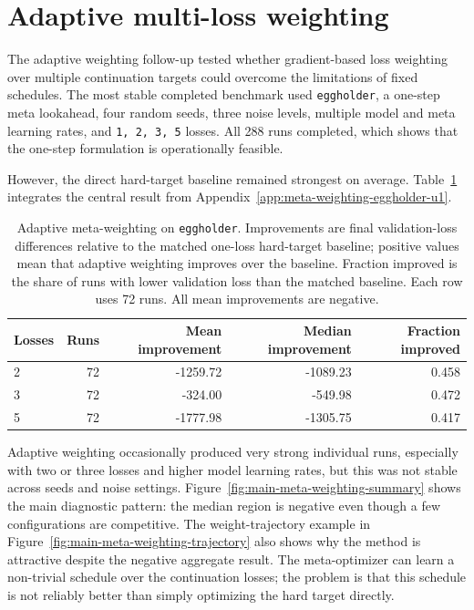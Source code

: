 \documentclass[english,master,a4paper,oneside]{ppfcmthesis}
\begin{document}
\section{Adaptive multi-loss weighting}

The adaptive weighting follow-up tested whether gradient-based loss weighting
over multiple continuation targets could overcome the limitations of fixed
schedules. The most stable completed benchmark used \texttt{eggholder}, a
one-step meta lookahead, four random seeds, three noise levels, multiple model
and meta learning rates, and \texttt{1, 2, 3, 5} losses. All 288 runs completed,
which shows that the one-step formulation is operationally feasible.

However, the direct hard-target baseline remained strongest on average.
Table~\ref{tab:main-meta-eggholder-summary} integrates the central result from
Appendix~\ref{app:meta-weighting-eggholder-u1}.

\begin{table}[htbp]
\centering
\small
\begin{tabular}{lrrrr}
\toprule
Losses & Runs & Mean improvement & Median improvement & Fraction improved \\
\midrule
2 & 72 & -1259.72 & -1089.23 & 0.458 \\
3 & 72 &  -324.00 &  -549.98 & 0.472 \\
5 & 72 & -1777.98 & -1305.75 & 0.417 \\
\bottomrule
\end{tabular}
\caption{Adaptive meta-weighting on \texttt{eggholder}. Improvements are final
validation-loss differences relative to the matched one-loss hard-target
baseline; positive values mean that adaptive weighting improves over the
baseline. Fraction improved is the share of runs with lower validation loss than
the matched baseline. Each row uses 72 runs. All mean improvements are negative.}
\label{tab:main-meta-eggholder-summary}
\end{table}

Adaptive weighting occasionally produced very strong individual runs, especially
with two or three losses and higher model learning rates, but this was not stable
across seeds and noise settings. Figure~\ref{fig:main-meta-weighting-summary}
shows the main diagnostic pattern: the median region is negative even though a
few configurations are competitive. The weight-trajectory example in
Figure~\ref{fig:main-meta-weighting-trajectory} also shows why the method is
attractive despite the negative aggregate result. The meta-optimizer can learn a
non-trivial schedule over the continuation losses; the problem is that this
schedule is not reliably better than simply optimizing the hard target directly.
\end{document}
